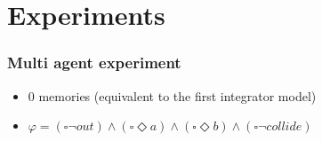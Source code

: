 \documentclass{beamer}
\newcommand{\LTLalways}		{\ensuremath{\square}}
\newcommand{\LTLeventually}	{\ensuremath{\Diamond}}
\renewcommand{\and}			{\ensuremath{\wedge}}
\begin{document}



\section{Experiments}
\begin{frame}
\frametitle{Multi agent experiment}
\begin{itemize}
\item 0 memories (equivalent to the first integrator model)
\item $\varphi = (\LTLalways \neg out) \and (\LTLalways \LTLeventually a) \and (\LTLalways \LTLeventually b) \and (\LTLalways \neg collide)$
\end{itemize}


\end{frame}
\end{document}

